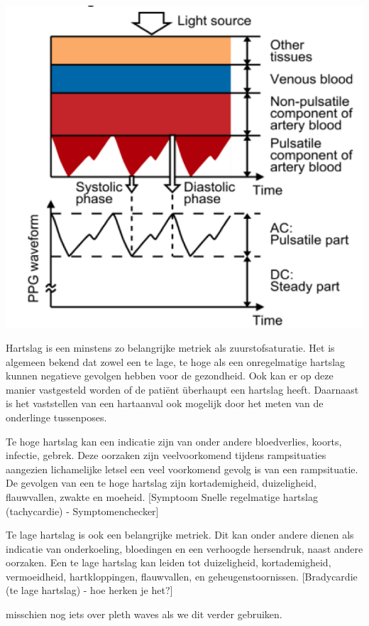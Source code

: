 \documentclass[11pt]{article}
\begin{document}
    \includegraphics[height=0.5\textheight]{Images/Tamura2.png}

    
    Hartslag is een minstens zo belangrijke metriek als zuurstofsaturatie. Het is algemeen bekend dat zowel een te lage, te hoge als een onregelmatige hartslag kunnen negatieve gevolgen hebben voor de gezondheid. 
    Ook kan er op deze manier vastgesteld worden of de patiënt überhaupt een hartslag heeft.
    Daarnaast is het vaststellen van een hartaanval ook mogelijk door het meten van de onderlinge tussenposes. 

    Te hoge hartslag kan een indicatie zijn van onder andere bloedverlies, koorts, infectie, gebrek. 
    Deze oorzaken zijn veelvoorkomend tijdens rampsituaties aangezien lichamelijke letsel een veel voorkomend gevolg is van een rampsituatie. 
    De gevolgen van een te hoge hartslag zijn kortademigheid, duizeligheid, flauwvallen, zwakte en moeheid.
    [Symptoom Snelle regelmatige hartslag (tachycardie) - Symptomenchecker]

    Te lage hartslag is ook een belangrijke metriek. 
    Dit kan onder andere dienen als indicatie van onderkoeling, bloedingen en een verhoogde hersendruk, naast andere oorzaken. 
    Een te lage hartslag kan leiden tot duizeligheid, kortademigheid, vermoeidheid, hartkloppingen, flauwvallen, en geheugenstoornissen. 
    [Bradycardie (te lage hartslag) - hoe herken je het?]

    misschien nog iets over pleth waves als we dit verder gebruiken.
\end{document}
